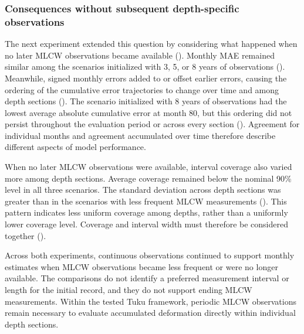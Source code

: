 \subsubsection{Consequences without subsequent depth-specific observations}

The next experiment extended this question by considering what happened when no later MLCW observations became available (). Monthly MAE remained similar among the scenarios initialized with 3, 5, or 8 years of observations (). Meanwhile, signed monthly errors added to or offset earlier errors, causing the ordering of the cumulative error trajectories to change over time and among depth sections (). The scenario initialized with 8 years of observations had the lowest average absolute cumulative error at month 80, but this ordering did not persist throughout the evaluation period or across every section (). Agreement for individual months and agreement accumulated over time therefore describe different aspects of model performance.

When no later MLCW observations were available, interval coverage also varied more among depth sections. Average coverage remained below the nominal 90\% level in all three scenarios. The standard deviation across depth sections was greater than in the scenarios with less frequent MLCW measurements (). This pattern indicates less uniform coverage among depths, rather than a uniformly lower coverage level. Coverage and interval width must therefore be considered together ().

Across both experiments, continuous observations continued to support monthly estimates when MLCW observations became less frequent or were no longer available. The comparisons do not identify a preferred measurement interval or length for the initial record, and they do not support ending MLCW measurements. Within the tested Tuku framework, periodic MLCW observations remain necessary to evaluate accumulated deformation directly within individual depth sections.

